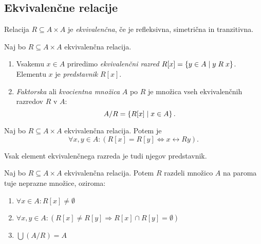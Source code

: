 \documentclass[12pt, a4paper]{article}
\renewcommand{\implies}{\Rightarrow}
\renewcommand{\iff}{\Leftrightarrow}
\begin{document}
\obvs

\newpage

\subsection{Ekvivalenčne relacije}

\begin{okvir}
\begin{definicija}
Relacija $R\subseteq A\times A$ je \emph{ekvivalenčna}, če je refleksivna, simetrična in tranzitivna.
\end{definicija}
\end{okvir}

\begin{definicija}
Naj bo $R\subseteq A\times A$ ekvivalenčna relacija.

\begin{enumerate}
\item Vsakemu $x\in A$ priredimo \emph{ekvivalenčni razred} $R[x]=\left\{y\in A\mid y\mathrel{R}x\right\}$. Elementu $x$ je \emph{predstavnik} $R[x]$.
\item \emph{Faktorska} ali \emph{kvocientna množica} $A$ po $R$ je množica vseh ekvivalenčnih razredov $R$ v $A$:
\[
A/R=\left\{R[x]\mid x\in A\right\}.
\]
\end{enumerate}
\end{definicija}

\begin{lema}
Naj bo $R\subseteq A\times A$ ekvivalenčna relacija. Potem je
\[
\forall x,y\in A\colon(R[x]=R[y]\iff x\rel{R}y).
\]
\end{lema}

\obvs

\begin{posledica}
Vsak element ekvivalenčnega razreda je tudi njegov predstavnik.
\end{posledica}

\begin{izrek}
Naj bo $R\subseteq A\times A$ ekvivalenčna relacija. Potem $R$ razdeli množico $A$ na paroma tuje neprazne množice, oziroma:

\begin{enumerate}
\item $\forall x\in A\colon R[x]\ne\emptyset$
\item $\forall x,y\in A\colon(R[x]\ne R[y]\implies R[x]\cap R[y]=\emptyset)$
\item $\bigcup (A/R)=A$
\end{enumerate}
\end{izrek}
\end{document}
